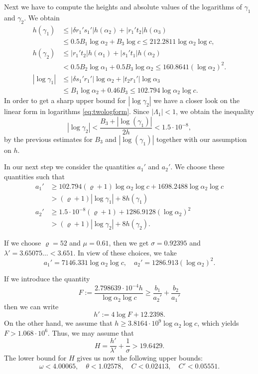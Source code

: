\documentclass{amsart}
\theoremstyle{definition}
\begin{document}
Next we have to compute the heights and absolute values of the logarithms of $\gamma_1$ and $\gamma_2$. We obtain   
\begin{align*}
h(\gamma_1) &\le |\delta r_1's_1' | h(\alpha_2)  + |r_1't_2| h(\alpha_3)\\
&\le 0.5B_1\log \alpha_2 + B_3 \log c \le 212.2811 \log \alpha_2\log c,\\
h(\gamma_2) &\le |r_1't_2| h(\alpha_1) + |s_1't_1|h(\alpha_2)\\
&<0.5B_2 \log \alpha_1 + 0.5 B_3 \log \alpha_2\le 160.8641 (\log \alpha_2)^2.\\
|\log \gamma_1| &\le |\delta s_1' r_1'| \log \alpha_2  + |t_2r_1'| \log \alpha_3\\
&\le B_1 \log \alpha_2  + 0.46 B_3 \le 102.794 \log \alpha_2\log c. 
\end{align*}
In order to get a sharp upper bound for $|\log\gamma_2|$ we have a closer look on the linear form in logarithms \eqref{eq:twologform}. Since $|\Lambda_1|<1$, we obtain the inequality
$$|\log \gamma_2|<\frac{B_3+|\log(\gamma_1)|}{2h}<1.5\cdot 10^{-8},$$
by the previous estimates for $B_3$ and $|\log(\gamma_1)|$ together with our assumption on $h$.

In our next step we consider the quantities $a_1'$ and $a_2'$. We choose these quantities such that
\begin{align*}
a_1' &\geq 102.794 (\varrho+1) \log \alpha_2 \log c+ 1698.2488 \log \alpha_2\log c\\
& >(\varrho +1) |\log \gamma_1| + 8 h(\gamma_1)\\   
a_2' &\geq 1.5\cdot 10^{-8}(\varrho+1)+1286.9128 (\log \alpha_2)^2\\
&>(\varrho +1) |\log \gamma_2| + 8 h(\gamma_2). 
\end{align*}

If we choose $\varrho=52$ and $\mu = 0.61$, then we get $\sigma =  0.92395$ and $\lambda' =  3.65075\dots <3.651$. 
In view of these choices, we take
 $$
 a_1'= 7146.331 \log \alpha_2 \log c, \quad a_2'= 1286.913(\log\alpha_2)^2.
 $$
 
If we introduce the quantity
 $$F:=\frac{2.798639\cdot10^{-4} h}{\log \alpha_2 \log c}\ge  \frac{b_1}{a_2'} + \frac{b_2}{a_1'}$$
then we can write
$$h':= 4\log F+12.2398.$$
On the other hand, we assume that $h\geq 3.8164\cdot 10^{9}\log \alpha_2 \log c$, which yields $F>1.068\cdot 10^6$.
Thus, we may assume that 
$$H=\frac{h'}{\lambda'} + \frac{1}{\sigma}>19.6429.$$
The lower bound for $H$ gives us now the following upper bounds:
$$
\omega<4.00065,\quad \theta<1.02578, \quad C<0.02413,\quad C'<0.05551. 
$$
\end{document}
